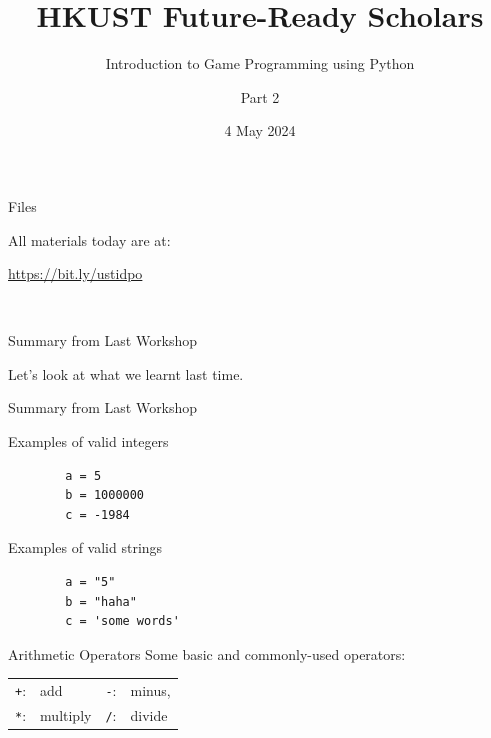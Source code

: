 \documentclass[dvipsnames, svgnames, x11names, handout]{beamer}
\title[HKUST Future-Ready Scholars]{HKUST Future-Ready Scholars}
\subtitle{Introduction to Game Programming using Python}
\author[Game Programming using Python]{Part 2}
\date[May 2024]{4 May 2024}
\begin{document}

\frame{\titlepage}

\begin{frame}[fragile]{Files}
    \begin{center}
        All materials today are at:

        \href{https://bit.ly/ustidpo}{https://bit.ly/ustidpo}

        \


    \end{center}
\end{frame}

\begin{frame}[fragile]{Summary from Last Workshop}
    \begin{center}
        Let's look at what we learnt last time.
    \end{center}
\end{frame}

\begin{frame}[fragile]{Summary from Last Workshop}
    \begin{block}{Examples of valid integers}
        \begin{verbatim}
        a = 5  
        b = 1000000   
        c = -1984
        \end{verbatim}
    \end{block}
    \begin{block}{Examples of valid strings}
        \begin{verbatim}
        a = "5"
        b = "haha"   
        c = 'some words'
        \end{verbatim}
    \end{block}
    \begin{block}{Arithmetic Operators}
        Some basic and commonly-used operators:\\
        \centering
        \begin{tabular}{rlrl}
        \texttt{+}:& add & \texttt{-}:& minus,\\
        \texttt{*}:& multiply & \texttt{/}:& divide
        \end{tabular}
    \end{block}
\end{frame}
\end{document}
